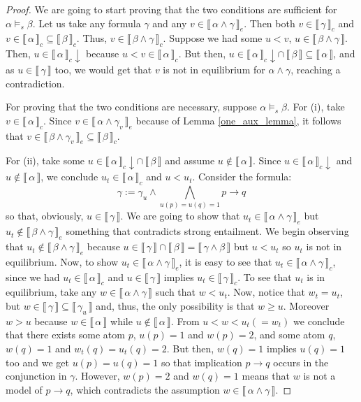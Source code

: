 \documentclass{tlp}
\def\down{\downarrow}
\newcommand{\den}[1]{\llbracket \, #1 \, \rrbracket}
\begin{document}
\begin{proof}
We are going to start proving that the two conditions are sufficient for $\alpha \models_{s} \beta$. Let us take any formula $\gamma$ and any $v \in \den{\alpha \wedge \gamma}_e$. Then both $v \in \den{\gamma}_c$ and $v \in \den{\alpha}_c \subseteq \den{\beta}_c$. Thus, $v \in \den{\beta \wedge \gamma}_c$. Suppose we had some $u < v$, $u \in \den{\beta \wedge \gamma}$. Then, $u \in \den{\alpha}_c \down$ because $u < v \in \den{\alpha}_c$. But then, $u \in \den{\alpha}_c \down \cap \, \den{\beta} \subseteq  \den{\alpha}$, and as $u \in \den{\gamma}$ too, we would get that $v$ is not in equilibrium for $\alpha \wedge \gamma$, reaching a contradiction.

For proving that the two conditions are necessary, suppose $\alpha \models_s \beta$. For (i), take $v \in \den{\alpha}_c$. Since $v \in \den{\alpha \wedge \gamma_v}_e$ because of Lemma \ref{one_aux_lemma}, it follows that $v \in \den{\beta \wedge \gamma_v}_e \subseteq \den{\beta}_c$. 

For (ii), take some $u \in \den{\alpha}_c \down \cap \, \den\beta$ and assume $u \not \in \den{\alpha}$. Since $u \in\den{\alpha}_c \down$ and $u \not\in\den\alpha$, we conclude $u_t \in \den{\alpha}_c$ and $u<u_t$. Consider the formula:
$$\gamma:= \gamma_{u} \wedge \bigwedge_{u(p)=u(q)=1} p \rightarrow q$$
\noindent so that, obviously, $u \in \den\gamma$. We are going to show that $u_t \in \den{\alpha \wedge \gamma}_e$ but $u_t \not \in \den{\beta \wedge \gamma}_e$ something that contradicts strong entailment. We begin observing that $u_t \not \in \den{\beta \wedge \gamma}_e$ because $u \in \den\gamma \cap \den\beta = \den{\gamma \wedge \beta}$ but $u<u_t$ so $u_t$ is not in equilibrium. Now, to show $u_t \in \den{\alpha \wedge \gamma}_e$, it is easy to see that $u_t \in \den{\alpha \wedge \gamma}_c$, since we had $u_t \in \den{\alpha}_c$ and $u \in \den\gamma$ implies $u_t\in \den{\gamma}_c$. To see that $u_t$ is in equilibrium, take any  $w \in \den{\alpha \wedge \gamma}$ such that $w < u_t$. Now, notice that $w_t=u_t$, but $w \in \den\gamma \subseteq \den{\gamma_u}$ and, thus, the only possibility is that $w \geq u$. Moreover $w > u$ because $w\in\den\alpha$ while $u \not\in \den\alpha$. From $u<w<u_t(=w_t)$ we conclude that there exists some atom $p$, $u(p)=1$ and $w(p)=2$, and some atom $q$, $w(q)=1$ and $w_t(q)=u_t(q)=2$. But then, $w(q)=1$ implies $u(q)=1$ too and we get $u(p)=u(q)=1$ so that implication $p \rightarrow q$ occurs in the conjunction in $\gamma$. However, $w(p)=2$ and $w(q)=1$ means that $w$ is not a model of $p\rightarrow q$, which contradicts the assumption $w \in\den{\alpha \wedge \gamma}$.
\end{proof}
\end{document}
